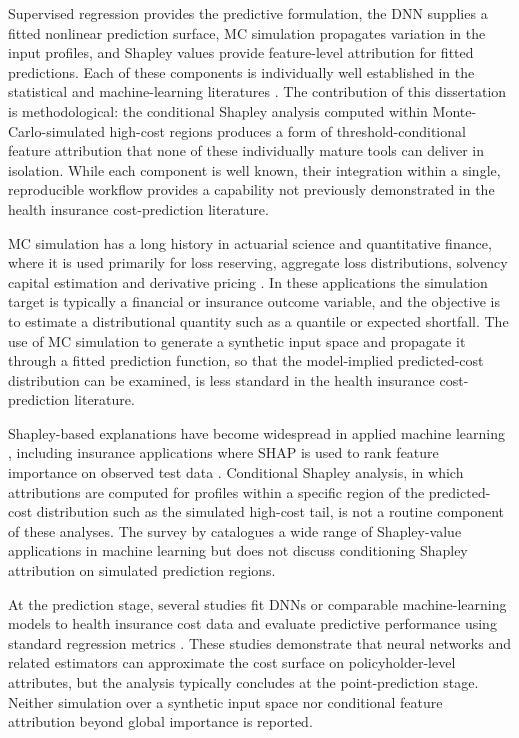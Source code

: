 \noindent
Supervised regression provides the predictive formulation,
the DNN supplies a fitted nonlinear prediction surface, MC
simulation propagates variation in the input profiles, and Shapley values
provide feature-level attribution for fitted predictions. Each of these
components is individually well established in the statistical and
machine-learning literatures
\citep{vapnik1998statistical, friedman2001greedy, robert2004monte,
lundberg2017unified, molnar2022interpretable}.
The contribution of this dissertation is methodological: the
conditional Shapley analysis computed within Monte-Carlo-simulated
high-cost regions produces a form of threshold-conditional feature
attribution that none of these individually mature tools can deliver
in isolation.  While each component is well known, their integration
within a single, reproducible workflow provides a capability not
previously demonstrated in the health insurance cost-prediction
literature.

\noindent
MC simulation has a long history in actuarial science and quantitative
finance, where it is used primarily for loss reserving, aggregate loss
distributions, solvency capital estimation and derivative pricing
\citep{glasserman2004monte}. In these applications the simulation target is
typically a financial or insurance outcome variable, and the objective is to
estimate a distributional quantity such as a quantile or expected shortfall. The
use of MC simulation to generate a synthetic input space and propagate
it through a fitted prediction function, so that the model-implied
predicted-cost distribution can be examined, is less standard in the
health insurance cost-prediction literature.

\noindent
Shapley-based explanations have become widespread in applied machine learning
\citep{rozemberczki2022shapley}, including insurance applications where
SHAP is used to rank feature importance on observed test data
\citep{kaushik2022machine}. Conditional Shapley analysis, in which attributions
are computed for profiles within a specific region of the predicted-cost
distribution such as the simulated high-cost tail, is not a routine component
of these analyses. The survey by \citet{rozemberczki2022shapley} catalogues a
wide range of Shapley-value applications in machine learning but does not
discuss conditioning Shapley attribution on simulated prediction regions.

\noindent
At the prediction stage, several studies fit DNNs or comparable
machine-learning models to health insurance cost data and evaluate predictive
performance using standard regression metrics
\citep{samiuddin2023health, dreweboss2022deep, kaushik2022machine}. These
studies demonstrate that neural networks and related estimators can approximate
the cost surface on policyholder-level attributes, but the analysis typically
concludes at the point-prediction stage. Neither simulation over a synthetic
input space nor conditional feature attribution beyond global importance is
reported.


